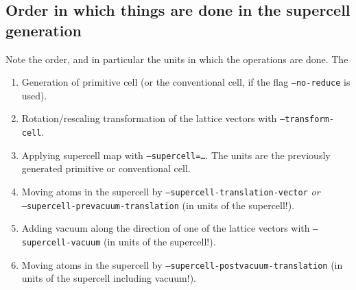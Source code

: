 \documentclass[11pt]{article}
\begin{document}
\subsection{Order in which things are done in the supercell generation}
Note the order, and in particular the units in which the operations are done. The 
\begin{enumerate}
\item Generation of primitive cell (or the conventional cell, if the flag \texttt{--no-reduce} is used).
\item Rotation/rescaling transformation of the lattice vectors with \texttt{--transform-cell}.
\item Applying supercell map with \texttt{--supercell=\ldots}. The units are the previously generated primitive or conventional cell.
\item Moving atoms in the supercell by \texttt{--supercell-translation-vector} \emph{or} \\ \texttt{--supercell-prevacuum-translation} (in units of the supercell!).
\item Adding vacuum along the direction of one of the lattice vectors with \texttt{--supercell-vacuum} (in units of the supercell!).
\item Moving atoms in the supercell by \texttt{--supercell-postvacuum-translation} (in units of the supercell including vacuum!).
\end{enumerate}
\end{document}
